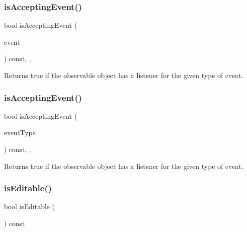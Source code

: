 \subsubsection{\texorpdfstring{is\+Accepting\+Event()}{isAcceptingEvent()}\hspace{0.1cm}{\footnotesize\ttfamily [2/3]}}
{\footnotesize\ttfamily bool is\+Accepting\+Event (\begin{DoxyParamCaption}\item[{const \mbox{\hyperlink{classGEvent}{G\+Event}} \&}]{event }\end{DoxyParamCaption}) const\hspace{0.3cm}{\ttfamily [protected]}, {\ttfamily [virtual]}, {\ttfamily [inherited]}}



Returns true if the observable object has a listener for the given type of event. 

\mbox{\label{classGObservable_a3b1c689267eda44e65a2213e7de38b23}} 
\subsubsection{\texorpdfstring{is\+Accepting\+Event()}{isAcceptingEvent()}\hspace{0.1cm}{\footnotesize\ttfamily [3/3]}}
{\footnotesize\ttfamily bool is\+Accepting\+Event (\begin{DoxyParamCaption}\item[{const std\+::string \&}]{event\+Type }\end{DoxyParamCaption}) const\hspace{0.3cm}{\ttfamily [protected]}, {\ttfamily [virtual]}, {\ttfamily [inherited]}}



Returns true if the observable object has a listener for the given type of event. 

\mbox{\label{classGBrowserPane_a012b5afb54e037e6c5498cf0932a521b}} 
\subsubsection{\texorpdfstring{is\+Editable()}{isEditable()}}
{\footnotesize\ttfamily bool is\+Editable (\begin{DoxyParamCaption}{ }\end{DoxyParamCaption}) const\hspace{0.3cm}{\ttfamily [virtual]}}



